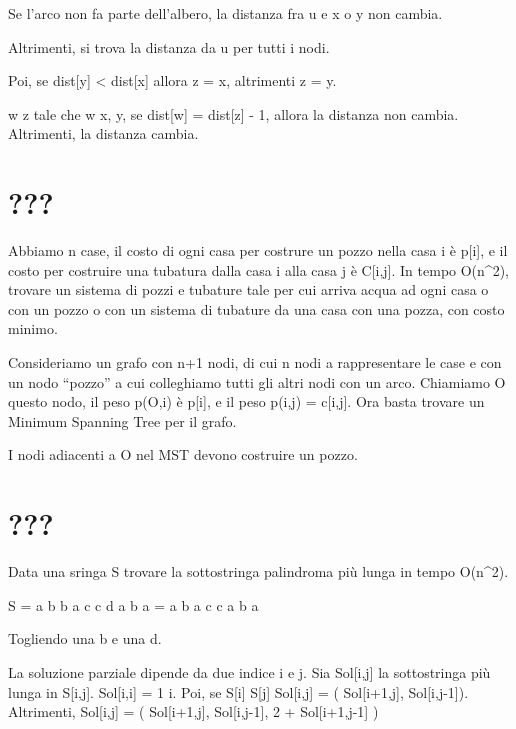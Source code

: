 Se l'arco non fa parte dell'albero, la distanza fra u e x o y non cambia.

Altrimenti, si trova la distanza da u per tutti i nodi. 

Poi, se dist[y] < dist[x] allora z = x, altrimenti z = y.

\forall w \adj z tale che w \neq x, y, se dist[w] = dist[z] - 1, allora la distanza non cambia. Altrimenti, la distanza cambia.

\clearpage

\section{???}

Abbiamo n case, il costo di ogni casa per costrure un pozzo nella casa i \`e p[i], e il costo per costruire una tubatura dalla casa i alla casa j \`e C[i,j]. In tempo O(n^2), trovare un sistema di pozzi e tubature tale per cui arriva acqua ad ogni casa o con un pozzo o con un sistema di tubature da una casa con una pozza, con costo minimo.

Consideriamo un grafo con n+1 nodi, di cui n nodi a rappresentare le case e con un nodo ``pozzo'' a cui colleghiamo tutti gli altri nodi con un arco. Chiamiamo O questo nodo, il peso p(O,i) \`e p[i], e il peso p(i,j) = c[i,j]. Ora basta trovare un Minimum Spanning Tree per il grafo.

I nodi adiacenti a O nel MST devono costruire un pozzo.

\clearpage

\section{???}

Data una sringa S trovare la sottostringa palindroma pi\`u lunga in tempo O(n^2).

S = a b b a c c d a b a
= a b a c c a b a

Togliendo una b e una d.

La soluzione parziale dipende da due indice i e j. Sia Sol[i,j] la sottostringa pi\`u lunga in S[i,j]. Sol[i,i] = 1 \forall i. Poi, se S[i] \neq S[j] \implies Sol[i,j] = \max( Sol[i+1,j], Sol[i,j-1]). Altrimenti, Sol[i,j] = \max( Sol[i+1,j], Sol[i,j-1], 2 + Sol[i+1,j-1] )




















